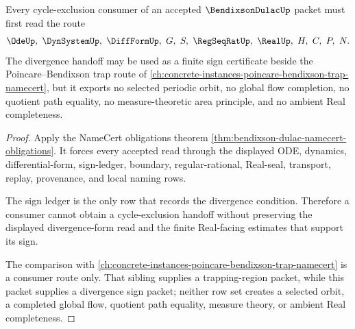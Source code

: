 \begin{theorem}
\label{thm:bendixson-dulac-divergence-handoff}
Every cycle-exclusion consumer of an accepted $\BendixsonDulacUp$ packet must first read the route
$$
\OdeUp,\ \DynSystemUp,\ \DiffFormUp,\ G,\ S,\ \RegSeqRatUp,\ \RealUp,\ H,\ C,\ P,\ N .
$$
The divergence handoff may be used as a finite sign certificate beside the Poincare--Bendixson trap route of \autoref{ch:concrete-instances-poincare-bendixson-trap-namecert}, but it exports no selected periodic orbit, no global flow completion, no quotient path equality, no measure-theoretic area principle, and no ambient Real completeness.
\end{theorem}
\begin{proof}
Apply the NameCert obligations theorem \autoref{thm:bendixson-dulac-namecert-obligations}. It forces every accepted read through the displayed ODE, dynamics, differential-form, sign-ledger, boundary, regular-rational, Real-seal, transport, replay, provenance, and local naming rows.

The sign ledger is the only row that records the divergence condition. Therefore a consumer cannot obtain a cycle-exclusion handoff without preserving the displayed divergence-form read and the finite Real-facing estimates that support its sign.

The comparison with \autoref{ch:concrete-instances-poincare-bendixson-trap-namecert} is a consumer route only. That sibling supplies a trapping-region packet, while this packet supplies a divergence sign packet; neither row set creates a selected orbit, a completed global flow, quotient path equality, measure theory, or ambient Real completeness.
\end{proof}




